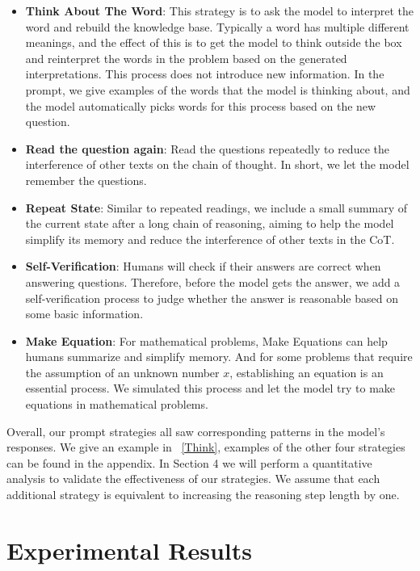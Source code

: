 \documentclass[11pt]{article}
\begin{document}
\begin{itemize}[leftmargin=*]\setlength\itemsep{-0.3em}
\item 
\textbf{Think About The Word}: This strategy is to ask the model to interpret the word and rebuild the knowledge base. Typically a word has multiple different meanings, and the effect of this is to get the model to think outside the box and reinterpret the words in the problem based on the generated interpretations. This process does not introduce new information. In the prompt, we give examples of the words that the model is thinking about, and the model automatically picks words for this process based on the new question.

\item 
\textbf{Read the question again}: Read the questions repeatedly to reduce the interference of other texts on the chain of thought. In short, we let the model remember the questions.

\item 
\textbf{Repeat State}: Similar to repeated readings, we include a small summary of the current state after a long chain of reasoning, aiming to help the model simplify its memory and reduce the interference of other texts in the CoT.

\item 
\textbf{Self-Verification}: Humans will check if their answers are correct when answering questions. Therefore, before the model gets the answer, we add a self-verification process to judge whether the answer is reasonable based on some basic information.

\item 
\textbf{Make Equation}: For mathematical problems, Make Equations can help humans summarize and simplify memory. And for some problems that require the assumption of an unknown number $x$, establishing an equation is an essential process. We simulated this process and let the model try to make equations in mathematical problems.
\end{itemize}

Overall, our prompt strategies all saw corresponding patterns in the model's responses. We give an example in ~\autoref{Think}, examples of the other four strategies can be found in the appendix. In Section 4 we will perform a quantitative analysis to validate the effectiveness of our strategies. We assume that each additional strategy is equivalent to increasing the reasoning step length by one.


\section{Experimental Results}
\end{document}
